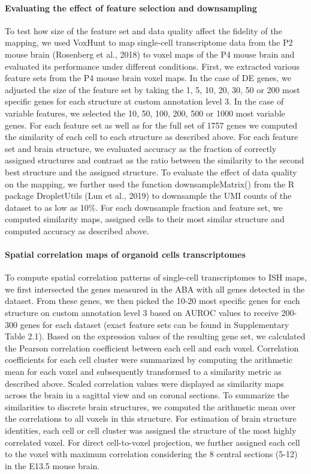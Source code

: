 \paragraph{Evaluating the effect of feature selection and downsampling}
To test how size of the feature set and data quality affect the fidelity of the mapping, we used VoxHunt to map single-cell transcriptome data from the P2 mouse brain (Rosenberg et al., 2018) to voxel maps of the P4 mouse brain and evaluated its performance under different conditions. First, we extracted various feature sets from the P4 mouse brain voxel maps. In the case of DE genes, we adjusted the size of the feature set by taking the 1, 5, 10, 20, 30, 50 or 200 most specific genes for each structure at custom annotation level 3. In the case of variable features, we selected the 10, 50, 100, 200, 500 or 1000 most variable genes. For each feature set as well as for the full set of 1757 genes we computed the similarity of each cell to each structure as described above. For each feature set and brain structure, we evaluated accuracy as the fraction of correctly assigned structures and contrast as the ratio between the similarity to the second best structure and the assigned structure. To evaluate the effect of data quality on the mapping, we further used the function downsampleMatrix() from the R package DropletUtils (Lun et al., 2019) to downsample the UMI counts of the dataset to as low as 10\%. For each downsample fraction and feature set, we computed similarity maps, assigned cells to their most similar structure and computed accuracy as described above.

\paragraph{Spatial correlation maps of organoid cells transcriptomes}
To compute spatial correlation patterns of single-cell transcriptomes to ISH maps, we first intersected the genes measured in the ABA with all genes detected in the dataset. From these genes, we then picked the 10-20 most specific genes for each structure on custom annotation level 3 based on AUROC values to receive 200-300 genes for each dataset (exact feature sets can be found in Supplementary Table 2.1). Based on the expression values of the resulting gene set, we calculated the Pearson correlation coefficient between each cell and each voxel. Correlation coefficients for each cell cluster were summarized by computing the arithmetic mean for each voxel and subsequently transformed to a similarity metric as described above. Scaled correlation values were displayed as similarity maps across the brain in a sagittal view and on coronal sections. To summarize the similarities to discrete brain structures, we computed the arithmetic mean over the correlations to all voxels in this structure. For estimation of brain structure identities, each cell or cell cluster was assigned the structure of the most highly correlated voxel.  For direct cell-to-voxel projection, we further assigned each cell to the voxel with maximum correlation considering the 8 central sections (5-12) in the E13.5 mouse brain.

